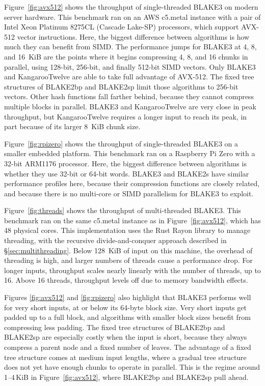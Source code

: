 \documentclass[11pt,notitlepage,a4paper]{article}
\begin{document}
Figure~\ref{fig:avx512} shows the throughput of single-threaded BLAKE3 on
modern server hardware. This benchmark ran on an AWS c5.metal instance with a
pair of Intel Xeon Platinum 8275CL (Cascade Lake-SP) processors, which support AVX-512 vector
instructions. Here, the biggest difference between algorithms is how much they
can benefit from SIMD. The performance jumps for BLAKE3 at 4, 8, and 16~KiB are
the points where it begins compressing 4, 8, and 16 chunks in parallel, using
128-bit, 256-bit, and finally 512-bit SIMD vectors. Only BLAKE3 and
KangarooTwelve are able to take full advantage of AVX-512. The fixed tree
structures of BLAKE2bp and BLAKE2sp limit those algorithms to 256-bit vectors.
Other hash functions fall farther behind, because they cannot compress multiple
blocks in parallel. BLAKE3 and KangarooTwelve are very close in peak
throughput, but KangarooTwelve requires a longer input to reach its peak, in
part because of its larger 8~KiB chunk size.

Figure~\ref{fig:rpizero} shows the throughput of single-threaded BLAKE3 on a
smaller embedded platform. This benchmark ran on a Raspberry Pi Zero with a
32-bit ARM1176 processor. Here, the biggest difference between algorithms is
whether they use 32-bit or 64-bit words. BLAKE3 and BLAKE2s have similar
performance profiles here, because their compression functions are closely
related, and because there is no multi-core or SIMD parallelism for BLAKE3 to
exploit.

Figure~\ref{fig:threads} shows the throughput of multi-threaded BLAKE3. This
benchmark ran on the same c5.metal instance as in Figure~\ref{fig:avx512},
which has 48 physical cores. This implementation uses the Rust Rayon library to
manage threading, with the recursive divide-and-conquer approach described in
\S\ref{sec:multithreading}. Below 128~KiB of input on this machine, the
overhead of threading is high, and larger numbers of threads cause a
performance drop. For longer inputs, throughput scales nearly linearly with the
number of threads, up to 16. Above 16 threads, throughput levels off due to
memory bandwidth effects.

Figures \ref{fig:avx512} and \ref{fig:rpizero} also highlight that BLAKE3
performs well for very short inputs, at or below its 64-byte block size. Very
short inputs get padded up to a full block, and algorithms with smaller block
sizes benefit from compressing less padding. The fixed tree structures of
BLAKE2bp and BLAKE2sp are especially costly when the input is short, because
they always compress a parent node and a fixed number of leaves. The advantage
of a fixed tree structure comes at medium input lengths, where a gradual tree
structure does not yet have enough chunks to operate in parallel. This is the
regime around 1--4\,KiB in Figure~\ref{fig:avx512}, where BLAKE2bp and BLAKE2sp
pull ahead.
\end{document}
